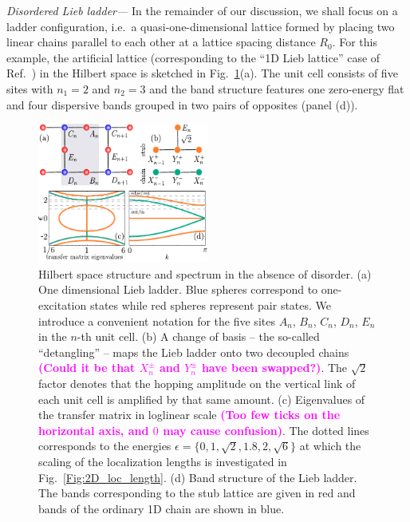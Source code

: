 \documentclass[prl,aps,twocolumn,showpacs,superscriptaddress,longbibliography]{revtex4-1}
\newcommand{\tochange}[1]{\textcolor{magenta}{#1}}
\newcommand{\mm}[1]{{\tochange{\footnotesize{\bf (#1)}}}}
\begin{document}
\emph{Disordered Lieb ladder---} In the remainder of our discussion, we shall focus on a ladder configuration, i.e.~a quasi-one-dimensional lattice formed by placing two linear chains parallel to each other at a lattice spacing distance $R_0$. For this example, the artificial lattice (corresponding to the ``1D Lieb lattice'' case of Ref.~\cite{Leykam2017}) in the Hilbert space is sketched in Fig.~\ref{Fig:decoupling}(a). The unit cell consists of five sites with $n_1 = 2$ and $n_2 = 3$ and the band structure features one zero-energy flat and four dispersive bands grouped in two pairs of opposites (panel (d)). 
%
\begin{figure}
% 	    

	      \includegraphics[width=0.5\textwidth]{graphics/decoupling.pdf}

		\caption{Hilbert space structure and spectrum in the absence of disorder. (a) One dimensional Lieb ladder. Blue spheres correspond to one-excitation states while red spheres represent pair states. We introduce a convenient notation for the five sites $A_n$, $B_n$, $C_n$, $D_n$, $E_n$ in the $n$-th unit cell. (b) A change of basis -- the so-called ``detangling'' \cite{a_Flach_EPL_14,Leykam2017} -- maps the Lieb ladder onto two decoupled chains \mm{Could it be that $X_n^\pm$ and $Y_n^\pm$ have been swapped?}. The $\sqrt{2}$ factor denotes that the hopping amplitude on the vertical link of each unit cell is amplified by that same amount.
		     (c) Eigenvalues of the transfer matrix in loglinear scale \mm{Too few ticks on the horizontal axis, and $0$ may cause confusion}.
		     The dotted lines corresponds to the energies $\epsilon = \{0,1, \sqrt 2, 1.8, 2, \sqrt 6\}$ at which the scaling of the localization lengths is investigated in Fig.~\ref{Fig:2D_loc_length}.
                    (d) Band structure of the Lieb ladder. The bands corresponding to the stub lattice are given in red and bands of the ordinary 1D chain are shown in blue.
                    }
  
	\label{Fig:decoupling}
\end{figure}  
%
%
\end{document}
